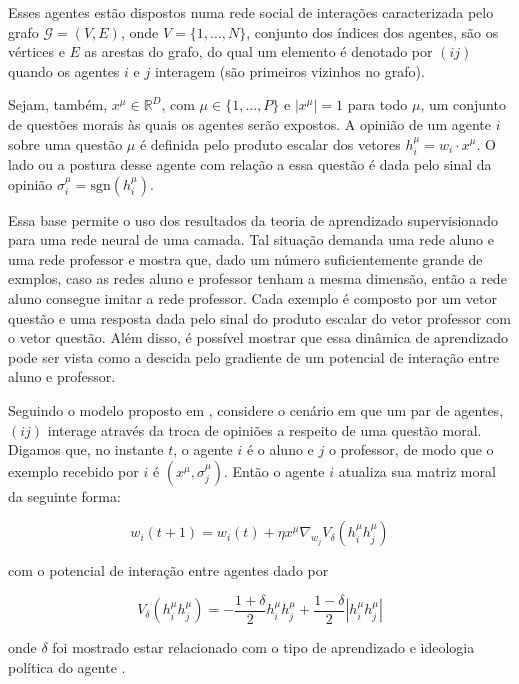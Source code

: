 \documentclass[11pt]{article}
\begin{document}
Esses agentes estão dispostos numa rede social de interações
caracterizada pelo grafo $\mathcal{G}=(V,E)$, onde $V = \{1,\ldots,N\}$,
conjunto
dos índices dos agentes, são os vértices e $E$ as arestas do grafo, do qual um
elemento é denotado por $(ij)$ quando os agentes $i$ e $j$ 
interagem (são primeiros vizinhos no grafo).

Sejam, também, $x^{\mu} \in
\mathbb{R}^D$, com $\mu \in \{1,\ldots,P\}$ e $|x^{\mu}|=1$ para todo $\mu$, um
conjunto de questões morais às quais os agentes serão expostos. 
A opinião de um agente $i$ sobre uma questão $\mu$ é definida pelo produto
escalar dos vetores $h_i^{\mu}=w_i \cdot x^{\mu}$. O lado ou a postura desse
agente com relação a essa questão é dada pelo sinal da opinião
$\sigma_i^{\mu}=\mathrm{sgn}(h_i^{\mu})$.

Essa base permite o uso dos resultados da teoria de aprendizado supervisionado
para uma rede neural de uma camada. Tal
situação demanda uma rede aluno e uma rede professor e mostra que, dado um
número suficientemente grande de exmplos, caso as redes aluno e professor tenham
a
mesma dimensão, então a rede aluno consegue imitar a rede professor. Cada
exemplo é composto por um vetor questão e uma resposta dada pelo sinal do
produto escalar do vetor professor com o vetor questão.
Além disso, é possível mostrar \cite{Engel} que essa dinâmica de
aprendizado pode ser vista como a descida pelo gradiente de um potencial de
interação entre aluno e professor.

Seguindo o modelo proposto em \cite{visujeca}, considere o cenário em que
um par de agentes, $(ij)$ interage através da troca de opiniões a respeito de uma
questão moral. Digamos que, no instante $t$, o agente $i$ é o aluno e $j$ o
professor, de modo que o exemplo recebido por $i$ é $(x^{\mu}, \sigma_j^{\mu})$.
Então o agente $i$ atualiza sua matriz moral da seguinte forma:

\begin{equation*}
    w_i(t+1)= w_i(t)+\eta x^{\mu}\nabla_{w_j}V_{\delta}(h_i^{\mu}h_ j^{\mu})
\end{equation*}

com o potencial de interação entre agentes dado por

\begin{equation}
    V_{\delta}(h_i^{\mu}h_j^{\mu})=-\frac{1+\delta}{2}h_i^{\mu}h_j^{\mu}+
    \frac{1-\delta}{2}|h_i^{\mu}h_j^{\mu}|
\end{equation}

onde $\delta$ foi mostrado estar relacionado com o tipo de aprendizado e
ideologia política do
agente \cite{Jonatas}.
\end{document}
